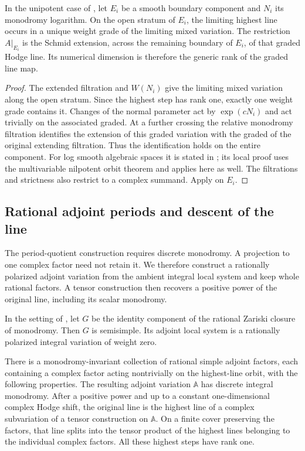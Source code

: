 \begin{lemma}
\label{period:boundary}
In the unipotent case of , let $E_i$ be a smooth
boundary component and $N_i$ its monodromy logarithm.  On the open
stratum of $E_i$, the limiting highest line occurs in a unique weight
grade of the limiting mixed variation.  The restriction $A|_{E_i}$
is the Schmid extension, across the remaining boundary of $E_i$, of
that graded Hodge line.  Its numerical dimension is therefore the
generic rank of the graded line map.
\end{lemma}

\begin{proof}
The extended filtration and $W(N_i)$ give the limiting mixed
variation along the open stratum.  Since the highest step has rank
one, exactly one weight grade contains it.  Changes of the normal
parameter act by $\exp(cN_i)$ and act trivially on the associated
graded.  At a further crossing the relative monodromy filtration
identifies the extension of this graded variation with the graded
of the original extending filtration.  Thus the identification holds
on the entire component.
For log smooth algebraic spaces it is stated in
\cite[\S2.5.3 and Lemma~2.16(3)]{BFMT}; its local proof uses the
multivariable nilpotent orbit theorem \cite{CKS} and applies here
as well.  The filtrations and strictness also restrict to a complex
summand.  Apply  on $E_i$.
\end{proof}

\subsection{Rational adjoint periods and descent of the line}

The period-quotient construction requires discrete monodromy.  A
projection to one complex factor need not retain it.  We therefore
construct a rationally polarized adjoint variation from the ambient
integral local system and keep whole rational factors.  A tensor
construction then recovers a positive power of the original line,
including its scalar monodromy.

\begin{lemma}
\label{period:adjoint-reduction}
In the setting of , let $G$ be the identity
component of the rational Zariski closure of monodromy.  Then $G$ is
semisimple.  Its adjoint local system is a rationally polarized
integral variation of weight zero.

There is a monodromy-invariant collection of rational simple adjoint
factors, each containing a complex factor acting nontrivially on the
highest-line orbit, with the following properties.  The resulting
adjoint variation $\mathbb A$ has discrete integral monodromy.  After a
positive power and up to a constant one-dimensional complex Hodge
shift, the original line is the highest line of a complex
subvariation of a tensor construction on $\mathbb A$.  On a finite
cover preserving the factors, that line splits into the tensor
product of the highest lines belonging to the individual complex
factors.  All these highest steps have rank one.
\end{lemma}

